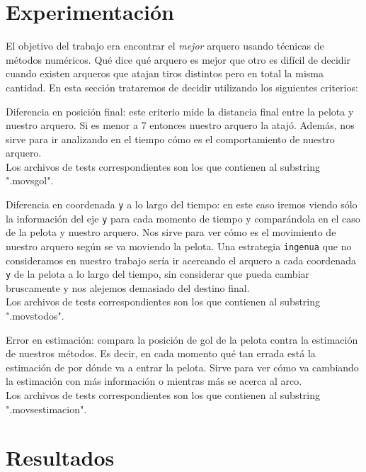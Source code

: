 \section{Experimentación}
El objetivo del trabajo era encontrar el \textit{mejor} arquero usando técnicas de métodos
numéricos. Qué dice qué arquero es mejor que otro es difícil de decidir cuando existen arqueros que
atajan tiros distintos pero en total la misma cantidad. En esta sección trataremos de decidir
utilizando los siguientes criterios:
\begin{compactitem}
  \item Diferencia en posición final: este criterio mide la distancia final entre la pelota y
    nuestro arquero. Si es menor a 7 entonces nuestro arquero la atajó. Además, nos sirve para ir
    analizando en el tiempo cómo es el comportamiento de nuestro arquero. \\
    Los archivos de tests correspondientes son los que contienen al substring ".movsgol".
  \item Diferencia en coordenada \texttt{y} a lo largo del tiempo: en este caso iremos viendo sólo la
    información del eje \texttt{y} para cada momento de tiempo y comparándola en el caso de la pelota
    y nuestro arquero. Nos sirve para ver cómo es el movimiento de nuestro arquero según se va
    moviendo la pelota. Una estrategia \texttt{ingenua} que no consideramos en nuestro trabajo sería
    ir acercando el arquero a cada coordenada \texttt{y} de la pelota a lo largo del tiempo, sin
    considerar que pueda cambiar bruscamente y nos alejemos demasiado del destino final.
    \\
    Los archivos de tests correspondientes son los que contienen al substring ".movstodos".
  \item Error en estimación: compara la posición de gol de la pelota contra la estimación de
    nuestros métodos. Es decir, en cada momento qué tan errada está la estimación de por dónde va a
    entrar la pelota. Sirve para ver cómo va cambiando la estimación con más información o mientras
    más se acerca al arco.
    \\
    Los archivos de tests correspondientes son los que contienen al substring ".movsestimacion".
  \end{compactitem}


\section{Resultados}


